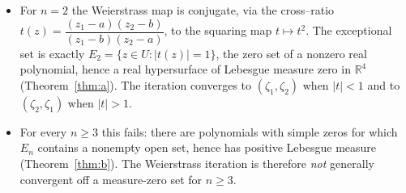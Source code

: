 \documentclass{amsart}
\theoremstyle{definition}
\theoremstyle{remark}
\newcommand{\R}{\mathbb{R}}
\begin{document}
\begin{itemize}
\item For $n=2$ the Weierstrass map is conjugate, via the cross--ratio
$t(z)=\dfrac{(z_1-a)(z_2-b)}{(z_1-b)(z_2-a)}$, to the squaring map $t\mapsto t^{2}$. The
exceptional set is exactly $E_2=\{z\in U:|t(z)|=1\}$, the zero set of a nonzero real
polynomial, hence a real hypersurface of Lebesgue measure zero in $\R^4$
(Theorem~\ref{thm:a}). The iteration converges to $(\zeta_1,\zeta_2)$ when $|t|<1$ and to
$(\zeta_2,\zeta_1)$ when $|t|>1$.
\item For every $n\ge3$ this fails: there are polynomials with simple zeros for which $E_n$
contains a nonempty open set, hence has positive Lebesgue measure (Theorem~\ref{thm:b}). The
Weierstrass iteration is therefore \emph{not} generally convergent off a measure-zero set for
$n\ge3$.
\end{itemize}
\end{document}
